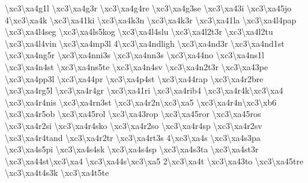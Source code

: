 {\textbackslash{}xc3\textbackslash{}xa4g1l \textbackslash{}xc3\textbackslash{}xa4g3r \textbackslash{}xc3\textbackslash{}xa4g4re \textbackslash{}xc3\textbackslash{}xa4g3se \textbackslash{}xc3\textbackslash{}xa43i \textbackslash{}xc3\textbackslash{}xa45jo 4\textbackslash{}xc3\textbackslash{}xa4k \textbackslash{}xc3\textbackslash{}xa41ki \textbackslash{}xc3\textbackslash{}xa4k3n \textbackslash{}xc3\textbackslash{}xa4k3r \textbackslash{}xc3\textbackslash{}xa41la \textbackslash{}xc3\textbackslash{}xa4l4pap \textbackslash{}xc3\textbackslash{}xa4l4seg \textbackslash{}xc3\textbackslash{}xa4ls5kog \textbackslash{}xc3\textbackslash{}xa4l4slu \textbackslash{}xc3\textbackslash{}xa4l2t3r \textbackslash{}xc3\textbackslash{}xa4l2tu \textbackslash{}xc3\textbackslash{}xa4l4vin \textbackslash{}xc3\textbackslash{}xa4mp3l 4\textbackslash{}xc3\textbackslash{}xa4ndligh \textbackslash{}xc3\textbackslash{}xa4nd3r \textbackslash{}xc3\textbackslash{}xa4nd1st \textbackslash{}xc3\textbackslash{}xa4ng5r \textbackslash{}xc3\textbackslash{}xa4nni3s \textbackslash{}xc3\textbackslash{}xa4nn3s \textbackslash{}xc3\textbackslash{}xa44no \textbackslash{}xc3\textbackslash{}xa4ns1l \textbackslash{}xc3\textbackslash{}xa4n4st \textbackslash{}xc3\textbackslash{}xa4ns5te \textbackslash{}xc3\textbackslash{}xa4n4sv \textbackslash{}xc3\textbackslash{}xa4n2t3r \textbackslash{}xc3\textbackslash{}xa43pe \textbackslash{}xc3\textbackslash{}xa4pp3l \textbackslash{}xc3\textbackslash{}xa44pr \textbackslash{}xc3\textbackslash{}xa4p4st \textbackslash{}xc3\textbackslash{}xa44rap \textbackslash{}xc3\textbackslash{}xa4r2bre \textbackslash{}xc3\textbackslash{}xa4rg5l \textbackslash{}xc3\textbackslash{}xa4r4gr \textbackslash{}xc3\textbackslash{}xa41ri \textbackslash{}xc3\textbackslash{}xa4rib4 \textbackslash{}xc3\textbackslash{}xa4r4k\textbackslash{}xc3\textbackslash{}xa4 \textbackslash{}xc3\textbackslash{}xa4r4nis \textbackslash{}xc3\textbackslash{}xa4rn3st \textbackslash{}xc3\textbackslash{}xa4r2n\textbackslash{}xc3\textbackslash{}xa5 \textbackslash{}xc3\textbackslash{}xa4r4n\textbackslash{}xc3\textbackslash{}xb6 \textbackslash{}xc3\textbackslash{}xa4r5ob \textbackslash{}xc3\textbackslash{}xa45rol \textbackslash{}xc3\textbackslash{}xa43rop \textbackslash{}xc3\textbackslash{}xa45ror \textbackslash{}xc3\textbackslash{}xa45ros \textbackslash{}xc3\textbackslash{}xa4r2si \textbackslash{}xc3\textbackslash{}xa4r4sko \textbackslash{}xc3\textbackslash{}xa4r2so \textbackslash{}xc3\textbackslash{}xa4r4sp \textbackslash{}xc3\textbackslash{}xa4r2sv \textbackslash{}xc3\textbackslash{}xa4r4tand \textbackslash{}xc3\textbackslash{}xa4r2tr \textbackslash{}xc3\textbackslash{}xa4rt3s 4\textbackslash{}xc3\textbackslash{}xa4s \textbackslash{}xc3\textbackslash{}xa4s3pa \textbackslash{}xc3\textbackslash{}xa4s5pi \textbackslash{}xc3\textbackslash{}xa4s4sk \textbackslash{}xc3\textbackslash{}xa4s4sp \textbackslash{}xc3\textbackslash{}xa4s3ta \textbackslash{}xc3\textbackslash{}xa4st3r \textbackslash{}xc3\textbackslash{}xa44st\textbackslash{}xc3\textbackslash{}xa4 \textbackslash{}xc3\textbackslash{}xa44s\textbackslash{}xc3\textbackslash{}xa5 2\textbackslash{}xc3\textbackslash{}xa4t \textbackslash{}xc3\textbackslash{}xa43to \textbackslash{}xc3\textbackslash{}xa45tre \textbackslash{}xc3\textbackslash{}xa4t4s3k \textbackslash{}xc3\textbackslash{}xa4t5te }
